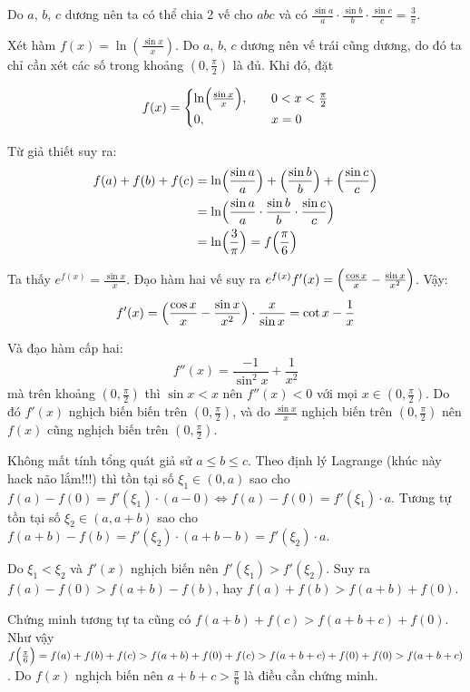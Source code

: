 \begin{solution}
    Do $a$, $b$, $c$ dương nên ta có thể chia 2 vế cho $abc$ và có
    $\frac{\sin a}{a} \cdot \frac{\sin b}{b} \cdot \frac{\sin c}{c} = \frac{3}{\pi}$.

    Xét hàm $f(x) = \ln (\frac{\sin x}{x})$. Do $a$, $b$, $c$ dương
    nên vế trái cũng dương, do đó ta chỉ cần xét các số trong khoảng
    $(0, \frac{\pi}{2})$ là đủ. Khi đó, đặt

    \[f(x) = \begin{cases} \ln\Bigl(\frac{\sin x}{x}\Bigr), \quad
        & 0 < x < \frac{\pi}{2} \\
        0, \quad & x = 0
    \end{cases}\]

    Từ giả thiết suy ra:
    \begin{align*}
        f(a) + f(b) + f(c) & = \ln \Bigl(\frac{\sin a}{a}\Bigr) 
        + \Bigl(\frac{\sin b}{b}\Bigr) + \Bigl(\frac{\sin c}{c}\Bigr) \\
        & = \ln\Bigl(\frac{\sin a}{a} \cdot \frac{\sin b}{b} 
        \cdot \frac{\sin c}{c}\Bigr) \\
        & = \ln\Bigl(\frac{3}{\pi}\Bigr) = f\Bigl(\frac{\pi}{6}\Bigr)
    \end{align*}

    Ta thấy $e^{f(x)} = \frac{\sin x}{x}$. Đạo hàm hai vế suy ra
    $e^{f(x)} f'(x) = \Bigl(\frac{\cos x}{x} - \frac{\sin x}{x^2}\Bigr)$.
    Vậy:
    \[f'(x) = \Bigl(\frac{\cos x}{x} - \frac{\sin x}{x^2}\Bigr)
    \cdot \frac{x}{\sin x} = \cot x - \frac{1}{x}\]

    Và đạo hàm cấp hai:
    \[f''(x) = \frac{-1}{\sin^2 x} + \frac{1}{x^2}\]
    mà trên khoảng $(0, \frac{\pi}{2})$ thì $\sin x < x$
    nên $f''(x) < 0$ với mọi $x \in (0, \frac{\pi}{2})$.
    Do đó $f'(x)$ nghịch biến biến trên $(0, \frac{\pi}{2})$,
    và do $\frac{\sin x}{x}$ nghịch biến trên $(0, \frac{\pi}{2})$
    nên $f(x)$ cũng nghịch biến trên $(0, \frac{\pi}{2})$.

    Không mất tính tổng quát giả sử $a \leq b \leq c$.
    Theo định lý Lagrange (khúc này hack não lắm!!!) thì
    tồn tại số $\xi_1 \in (0, a)$ sao cho $f(a) - f(0) = 
    f'(\xi_1) \cdot (a - 0) \Leftrightarrow f(a) - f(0) = f'(\xi_1) \cdot a$.
    Tương tự tồn tại số $\xi_2 \in (a, a+b)$ sao cho
    $f(a+b) - f(b) = f'(\xi_2) \cdot (a + b - b) = f'(\xi_2) \cdot a$.

    Do $\xi_1 < \xi_2$ và $f'(x)$ nghịch biến nên $f'(\xi_1) > f'(\xi_2)$.
    Suy ra $f(a) - f(0) > f(a+b) - f(b)$, hay 
    $f(a) + f(b) > f(a+b) + f(0)$.

    Chứng minh tương tự ta cũng có $f(a+b) + f(c) > f(a+b+c) + f(0)$.
    Như vậy $f\Bigl(\frac{\pi}{6}\Bigr) = 
    f(a) + f(b) + f(c) > f(a+b) + f(0) + f(c) 
    > f(a+b+c) + f(0) + f(0) > f(a + b + c)$. 
    Do $f(x)$ nghịch biến nên $a + b + c > \frac{\pi}{6}$ là điều
    cần chứng minh.
\end{solution}

